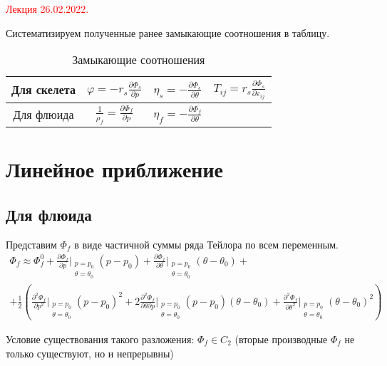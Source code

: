 \documentclass[main.tex]{subfiles}
\begin{document}
\textcolor{red}{Лекция 26.02.2022.}

Систематизируем полученные ранее замыкающие соотношения в таблицу.

\begin{table}[h]
\centering
\caption{Замыкающие соотношения}
\label{table:con}
{\renewcommand{\arraystretch}{3}
\begin{tabular}{ | c | c | c | c | }
\hline
Для скелета& $\displaystyle{}\varphi=-r_s\frac{\partial\Phi_s}{\partial p}$& $\displaystyle{}\eta_s=-\frac{\partial\Phi_s}{\partial\theta}$& $\displaystyle{}T_{ij}=r_s\frac{\partial\Phi_s}{\partial\varepsilon_{ij}}$ \\
\hline
Для флюида& $\displaystyle{}\frac{1}{\rho_f}=\frac{\partial\Phi_f}{\partial p}$& $\displaystyle{}\eta_f=-\frac{\partial\Phi_f}{\partial\theta}$ &  \\
\hline
\end{tabular}}
\end{table}

\section{Линейное приближение}

\subsection{Для флюида}

Представим $\Phi_f$ в виде частичной суммы ряда Тейлора по всем переменным.
\begin{multline}\label{PhiFTaylor}
\Phi_f\approx\Phi_f^0+\frac{\partial\Phi_f}{\partial p}\bigg|_{\substack{p=p_0\\ \theta=\theta_0}}\left(p-p_0\right)+\frac{\partial\Phi_f}{\partial\theta}\bigg|_{\substack{p=p_0\\ \theta=\theta_0}}\left(\theta-\theta_0\right)+\\+\frac{1}{2}\left(\frac{\partial^2\Phi_f}{\partial p^2}\bigg|_{\substack{p=p_0\\ \theta=\theta_0}}\left(p-p_0\right)^2+2\frac{\partial^2\Phi_f}{\partial\theta\partial p}\bigg|_{\substack{p=p_0\\ \theta=\theta_0}}\left(p-p_0\right)\left(\theta-\theta_0\right)+\frac{\partial^2\Phi_f}{\partial\theta^2}\bigg|_{\substack{p=p_0\\ \theta=\theta_0}}\left(\theta-\theta_0\right)^2\right)
\end{multline}

Условие существования такого разложения: $\Phi_f\in C_2$ (вторые производные $\Phi_f$ не только существуют, но и непрерывны)
\end{document}
